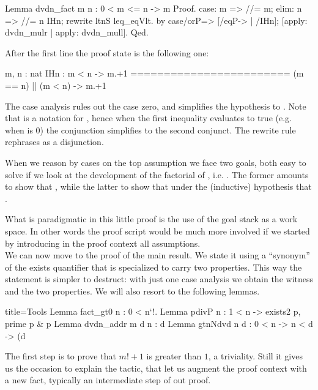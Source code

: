\begin{coq}{}{}
Lemma dvdn_fact m n : 0 < m <= n -> m %
Proof.
case: m => //= m; elim: n => //= n IHn; rewrite ltnS leq_eqVlt.
by case/orP=> [/eqP-> | /IHn]; [apply: dvdn_mulr | apply: dvdn_mull].
Qed.
\end{coq}

After the first line the proof state is the following one:

\begin{coqout}{}{}
m, n : nat
IHn : m < n -> m.+1 %
========================
(m == n) || (m < n) -> m.+1 %
\end{coqout}
The case analysis rules out the case  zero, and simplifies the hypothesis
to .  Note that  is a notation for , hence when the first inequality evaluates to true (e.g. when 
is 0) the conjunction simplifies to the second conjunct.  The 
rewrite rule rephrases \C{<=} as a disjunction.

When we reason by cases on the top assumption we face two goals, both
easy to solve if we look at the development of the factorial of ,
i.e. .  The former amounts to show that
, while the latter to show that  under the (inductive) hypothesis that .

What is paradigmatic in this little proof is the use of the goal stack
as a work space.  In other words the proof script would be much more involved
if we started by introducing in the proof context all assumptions.
\\

We can now move to the proof of the main result.  We state it using a
``synonym'' of the exists quantifier that is specialized to carry two
properties.  This way the statement is simpler to destruct: with just one
case analysis we obtain the witness and the two properties.
We will also resort to the following lemmas.

\begin{coq}{}{title=Tools}
Lemma fact_gt0 n : 0 < n`!.
Lemma pdivP n : 1 < n -> exists2 p, prime p & p %
Lemma dvdn_addr m d n : d %
Lemma gtnNdvd n d : 0 < n -> n < d -> (d %
\end{coq}
The first step is to prove that $m! + 1$ is greater than $1$, a triviality.
Still it gives us the occasion to explain the  tactic, that let us
augment the proof context with a new fact, typically an intermediate step of
out proof.

